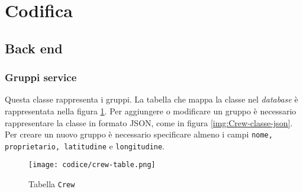 \section{Codifica}
\subsection{Back end}
\subsubsection{Gruppi service}
\label{par:Crew}
Questa classe rappresenta i gruppi. La tabella che mappa la classe nel
\textit{database} è rappresentata nella figura \ref{img:Crew-tabella}. Per
aggiungere o modificare un gruppo è necessario rappresentare la classe in
formato JSON, come in figura \ref{img:Crew-classe-json}. Per creare un nuovo
gruppo è necessario specificare almeno i campi \texttt{nome, proprietario,
    latitudine} e \texttt{longitudine}.

\begin{figure}[H]
    \centerline{\texttt{[image: codice/crew-table.png]}}
    \caption{Tabella \texttt{Crew}}
    \label{img:Crew-tabella}
\end{figure}



